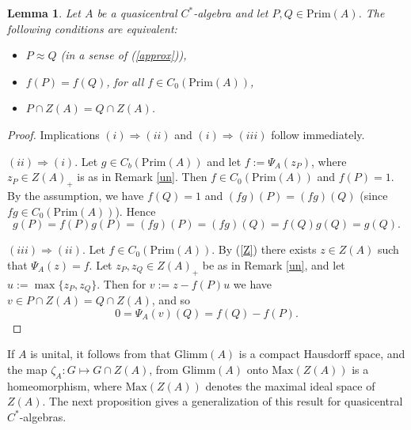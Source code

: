 \documentclass[]{amsart}
\newtheorem{lemma}[theorem]{Lemma}
\theoremstyle{remark}
\theoremstyle{definition}
\theoremstyle{question}
\numberwithin{equation}{section}
\begin{document}
\begin{lemma}\label{qct} Let $A$ be a quasicentral $C^*$-algebra and let $P,Q
\in \mathrm{Prim}(A)$. The following conditions are equivalent:
\begin{itemize}
\item[(i)] $P \approx Q$ (in a sense of (\ref{approx})),
\item[(ii)] $f(P)=f(Q)$, for all $f \in C_0(\mathrm{Prim}(A))$,
\item[(iii)] $P \cap Z(A)=Q \cap Z(A)$.
\end{itemize}
\end{lemma}
\begin{proof}
 Implications $(i)\Rightarrow (ii)$ and $(i)\Rightarrow (iii)$ follow
immediately.

$(ii)\Rightarrow (i)$. Let $g \in C_b(\mathrm{Prim}(A))$ and let
$f:=\Psi_A(z_P)$, where $z_P \in Z(A)_+$ is as in Remark \ref{un}. Then
 $f \in C_0(\mathrm{Prim}(A))$ and $f(P)=1$. By the assumption, we have $f(Q)=1$
and $(fg)(P)=(fg)(Q)$ (since $fg \in C_0(\mathrm{Prim}(A))$). Hence
$$g(P)=f(P)g(P)=(fg)(P)=(fg)(Q)=f(Q)g(Q)=g(Q).$$

$(iii)\Rightarrow (ii)$. Let $f \in C_0(\mathrm{Prim}(A))$. By (\ref{Z}) there
exists $z\in Z(A)$ such that $\Psi_A(z)=f$. Let $z_P, z_Q \in Z(A)_+$
 be as in Remark \ref{un}, and let $u:=\max\{z_P,z_Q\}$. Then for $v:=z-f(P)u$
we have $v \in P \cap Z(A)=Q \cap Z(A)$, and so
 $$0=\Psi_A(v)(Q)=f(Q)-f(P).$$
\end{proof}

If $A$ is unital, it follows from \cite{ArcSom1} that $\mathrm{Glimm}(A)$ is a compact Hausdorff space, and the map $\zeta_A: G \mapsto G \cap Z(A)$, from $\mathrm{Glimm}(A)$ onto $\mathrm{Max}(Z(A))$ is a homeomorphism, where $\mathrm{Max}(Z(A))$ denotes the maximal ideal space of $Z(A)$.
The next proposition gives a generalization of this result for quasicentral $C^*$-algebras.
\end{document}
